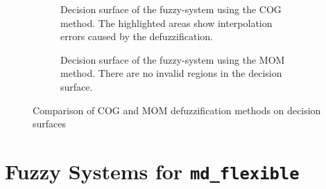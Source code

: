 \begin{figure}[H]
\begin{subfigure}[t]{0.48\textwidth}
        \caption[Decision surface of the fuzzy rules using COG method]{Decision surface of the fuzzy-system using the COG method. The highlighted areas show interpolation errors caused by the defuzzification.}
        \label{fig:fuzzyDecisionSurfaceExampleCOG}
    \end{subfigure}
    \hfill
    \begin{subfigure}[t]{0.48\textwidth}
        \centering
        \caption[Decision surface of the fuzzy rules using MOM method]{Decision surface of the fuzzy-system using the MOM method. There are no invalid regions in the decision surface.}
        \label{fig:fuzzyDecisionSurfaceExampleMOM}
    \end{subfigure}
    \caption{Comparison of COG and MOM defuzzification methods on decision surfaces}
    \label{fig:fuzzyDecisionSurfaceComparison}
\end{figure}


\section{Fuzzy Systems for \texttt{md\_flexible}}

